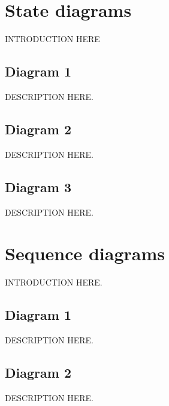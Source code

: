 \documentclass[11pt]{article}
\begin{document}
\pagebreak
\section{State diagrams}
INTRODUCTION HERE
\subsection{Diagram 1}
\vspace{10px}
\begin{center}
\end{center}
DESCRIPTION HERE.

\subsection{Diagram 2}
\vspace{10px}
\begin{center}
\end{center}
DESCRIPTION HERE.

\subsection{Diagram 3}
\vspace{10px}
\begin{center}
\end{center}
DESCRIPTION HERE.

\pagebreak
\section{Sequence diagrams}
INTRODUCTION HERE.
\subsection{Diagram 1}
\vspace{10px}
\begin{center}
\end{center}
DESCRIPTION HERE.
\subsection{Diagram 2}
\vspace{10px}
\begin{center}
\end{center}
DESCRIPTION HERE.
\end{document}
